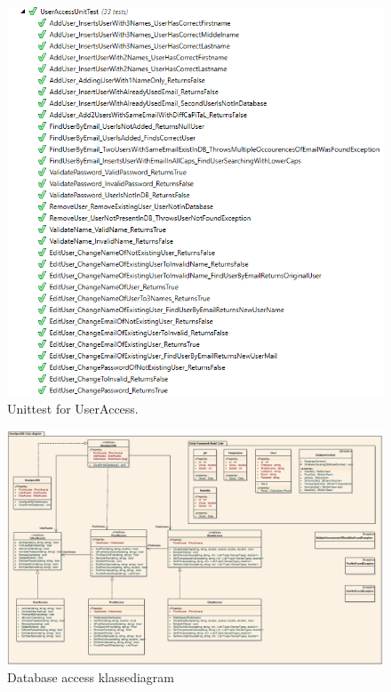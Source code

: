 \begin{figure}[h]
\centering
\includegraphics[width=0.8\linewidth]{figs/test/useraccessunittest_appendix.png}
\caption{Unittest for UserAccess.}
\label{fig:useraccessunittest_appendix}
\end{figure}

\begin{landscape}
	\begin{figure}[h]
		\centering
		\includegraphics[width=\linewidth]{figs/implementering/databaseFullClass.PNG}
		\caption{Database access klassediagram}
		\label{fig:databaseFullClass}
	\end{figure}
\end{landscape}

